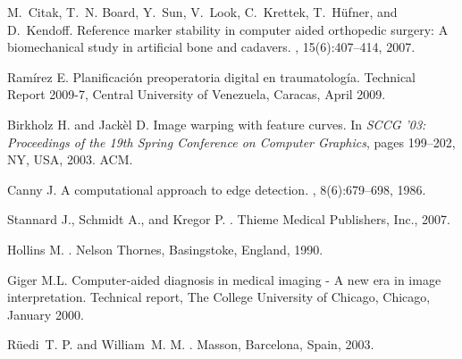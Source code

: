 \documentclass{cimenics}
\begin{document}
%
%
\begin{thebibliography}{1}

M.~Citak, T.~N. Board, Y.~Sun, V.~Look, C.~Krettek, T.~H\"{u}fner, and
  D.~Kendoff.
\newblock Reference marker stability in computer aided orthopedic surgery: A
  biomechanical study in artificial bone and cadavers.
, 15(6):407--414, 2007.

Ram\'{i}rez E.
\newblock Planificaci\'{o}n preoperatoria digital en traumatolog\'{i}a.
\newblock Technical Report 2009-7, Central University of Venezuela, Caracas,
  April 2009.

Birkholz H. and Jack\`{e}l D.
\newblock Image warping with feature curves.
\newblock In {\em SCCG '03: Proceedings of the 19th Spring Conference on
  Computer Graphics}, pages 199--202, NY, USA, 2003. ACM.

Canny J.
\newblock A computational approach to edge detection.
,
  8(6):679--698, 1986.

Stannard J., Schmidt A., and Kregor P.
.
\newblock Thieme Medical Publishers, Inc., 2007.

Hollins M.
.
\newblock Nelson Thornes, Basingstoke, England, 1990.

Giger M.L.
\newblock Computer-aided diagnosis in medical imaging - {A} new era in image
  interpretation.
\newblock Technical report, The College University of Chicago, Chicago, January
  2000.

R\"{u}edi~T. P. and William~M. M.
.
\newblock Masson, Barcelona, Spain, 2003.

\end{thebibliography}
\end{document}
